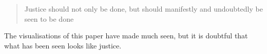 \documentclass[12pt]{article}
\begin{document}
\begin{quote}
  Justice should not only be done, but should manifestly and undoubtedly be seen to be done
\end{quote}

The visualisations of this paper have made much seen, but it is doubtful that what has been seen looks like justice.





\end{document}
